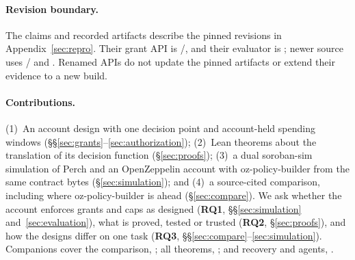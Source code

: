\paragraph{Revision boundary.} The claims and recorded artifacts describe the
pinned revisions in Appendix~\ref{sec:repro}. Their grant API is
/, and their evaluator is
; newer source uses
/ and .
Renamed APIs do not update the pinned artifacts or extend their evidence to a
new build.

\paragraph{Contributions.} (1)~An account design with one decision point and
account-held spending windows (\S\S\ref{sec:grants}--\ref{sec:authorization});
(2)~Lean theorems about the translation of its decision function
(\S\ref{sec:proofs}); (3)~a dual soroban-sim simulation of Perch and an
OpenZeppelin account with oz-policy-builder from the same contract bytes
(\S\ref{sec:simulation}); and (4)~a source-cited comparison, including where
oz-policy-builder is ahead (\S\ref{sec:compare}). We ask whether the account
enforces grants and caps as designed (\textbf{RQ1}, \S\S\ref{sec:simulation}
and~\ref{sec:evaluation}), what is proved, tested or trusted (\textbf{RQ2},
\S\ref{sec:proofs}), and how the designs differ on one task (\textbf{RQ3},
\S\S\ref{sec:compare}--\ref{sec:simulation}).
Companions cover the comparison, ; all theorems,
; and recovery and agents, .

